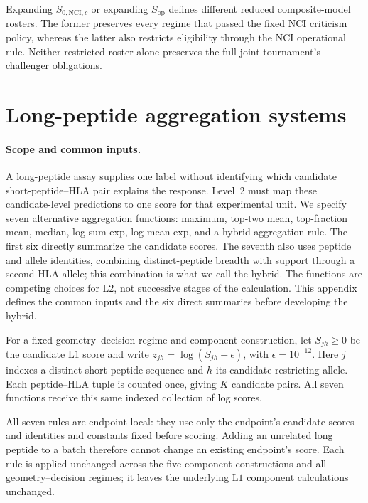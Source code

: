 \documentclass[11pt]{article}
\begin{document}
Expanding \(S_{0,\mathrm{NCI},c}\) or expanding \(S_{\mathrm{op}}\) defines
different reduced composite-model rosters. The former preserves every regime
that passed the fixed NCI criticism policy, whereas the latter also restricts
eligibility through the NCI operational rule. Neither restricted roster alone
preserves the full joint tournament's challenger obligations.

\section{Long-peptide aggregation systems}
\label{app:l2-systems}

\paragraph{Scope and common inputs.}
A long-peptide assay supplies one label without identifying which candidate
short-peptide--HLA pair explains the response. Level~2 must map these
candidate-level predictions to one score for that experimental unit. We
specify seven alternative aggregation functions: maximum, top-two mean,
top-fraction mean, median, log-sum-exp, log-mean-exp, and a hybrid aggregation
rule. The first six directly summarize the candidate scores. The seventh
also uses peptide and allele identities, combining distinct-peptide breadth
with support through a second HLA allele; this combination is what we call
the hybrid. The functions are competing choices for \(\mathrm{L2}\), not
successive stages of the calculation. This appendix defines the common inputs
and the six direct summaries before developing the hybrid.

For a fixed geometry--decision regime and component construction, let
\(S_{jh}\geq0\) be the candidate \(\mathrm{L1}\) score and write
\(z_{jh}=\log(S_{jh}+\epsilon)\), with \(\epsilon=10^{-12}\).
Here \(j\) indexes a distinct short-peptide sequence and \(h\) its
candidate restricting allele. Each peptide--HLA tuple is counted once, giving
\(K\) candidate pairs. All seven functions receive this same indexed
collection of log scores.

All seven rules are endpoint-local: they use only the endpoint's candidate
scores and identities and constants fixed before scoring. Adding an unrelated
long peptide to a batch therefore cannot change an existing endpoint's score.
Each rule is applied unchanged across the five component constructions and
all geometry--decision regimes; it leaves the underlying \(\mathrm{L1}\)
component calculations unchanged.
\end{document}
